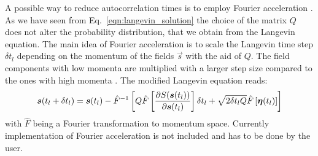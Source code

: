 A possible way to reduce autocorrelation times is to employ Fourier acceleration \cite{Batrouni85,Batrouni19}. As we have seen from Eq.~\ref{eqn:langevin_solution} the choice of the matrix $Q$ does not alter the probability distribution, that we obtain from the Langevin equation. The main idea of Fourier acceleration is to scale the Langevin time step $\delta t_l$ depending on the momentum of the fields $\vec{s}$ with the aid of $Q$. The field components with low momenta are multiplied with a larger step size compared to the ones with high momenta \cite{Davies86}. The modified Langevin equation reads:
\begin{equation}
   \boldsymbol{s}(t_{l} +  \delta t_{l})    =    \boldsymbol{s}(t_{l})    - \hat{F}^{-1} \left[ Q \hat{F}\left[\frac{\partial S( \boldsymbol{s}(t_{l})) }{\partial    \boldsymbol{s}(t_{l}) } \right]   \delta t_{l}     +\sqrt{2 \delta t_{l} Q} \hat{F}\left[\boldsymbol{\eta}(t_{l})\right] \right]
\end{equation}
with $\hat{F}$ being a Fourier transformation to momentum space. Currently implementation of Fourier acceleration is not included and has to be done by the user.


